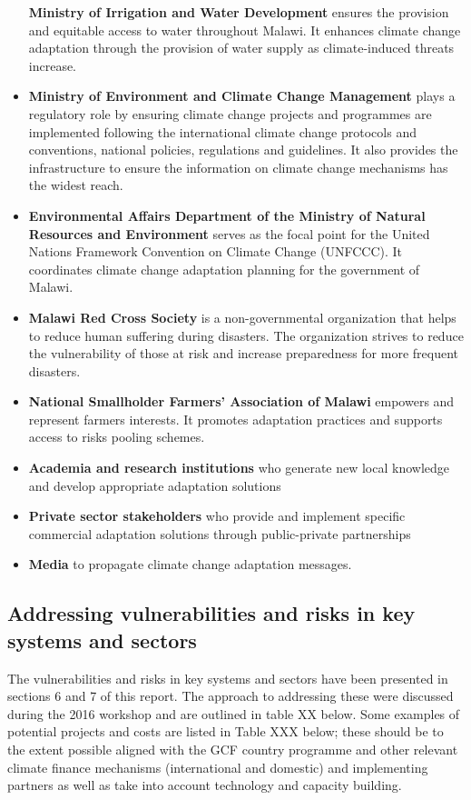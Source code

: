\documentclass[
]{book}
\begin{document}
\begin{itemize}
  \textbf{Ministry of Irrigation and Water Development} ensures the provision and equitable access to water throughout Malawi. It enhances climate change adaptation
  through the provision of water supply as climate-induced threats increase.
\item
  \textbf{Ministry of Environment and Climate Change Management} plays a regulatory role by ensuring climate change projects and programmes are implemented following
  the international climate change protocols and conventions, national policies, regulations and guidelines. It also provides the infrastructure to ensure the
  information on climate change mechanisms has the widest reach.
\item
  \textbf{Environmental Affairs Department of the Ministry of Natural Resources and Environment} serves as the focal point for the United Nations Framework Convention on Climate Change (UNFCCC). It coordinates climate change adaptation planning for the government of Malawi.
\item
  \textbf{Malawi Red Cross Society} is a non-governmental organization that helps to reduce human suffering during disasters. The organization strives to reduce the
  vulnerability of those at risk and increase preparedness for more frequent disasters.
\item
  \textbf{National Smallholder Farmers' Association of Malawi} empowers and represent farmers interests. It promotes adaptation practices and supports access to risks
  pooling schemes.
\item
  \textbf{Academia and research institutions} who generate new local knowledge and develop appropriate adaptation solutions
\item
  \textbf{Private sector stakeholders} who provide and implement specific commercial adaptation solutions through public-private partnerships
\item
  \textbf{Media} to propagate climate change adaptation messages.
\end{itemize}

\hypertarget{addressing-vulnerabilities-and-risks-in-key-systems-and-sectors}{%
\subsection{Addressing vulnerabilities and risks in key systems and sectors}\label{addressing-vulnerabilities-and-risks-in-key-systems-and-sectors}}

The vulnerabilities and risks in key systems and sectors have been presented in sections 6 and 7 of this report. The approach to addressing these were discussed
during the 2016 workshop and are outlined in table XX below. Some examples of potential projects and costs are listed in Table XXX below; these should be to the
extent possible aligned with the GCF country programme and other relevant climate finance mechanisms (international and domestic) and implementing partners as
well as take into account technology and capacity building.
\end{document}
